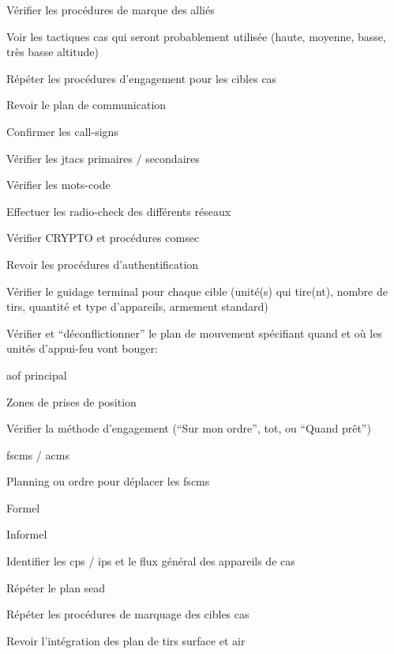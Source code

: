 \begin{e1}
\begin{e2}
\begin{e3}
			\item Vérifier les procédures de marque des alliés
			\item Voir les tactiques \gls{cas} qui seront probablement utilisée (haute, moyenne, basse, très basse altitude)
			\item Répéter les procédures d'engagement pour les cibles \gls{cas}
			\item Revoir le plan de communication
			\begin{e4}
				\item Confirmer les call-signs
				\item Vérifier les \glspl{jtac} primaires / secondaires
				\item Vérifier les mots-code
				\item Effectuer les radio-check des différents réseaux
				\item Vérifier CRYPTO et procédures \gls{comsec}
				\item Revoir les procédures d'authentification
			\end{e4}
			\item Vérifier le guidage terminal pour chaque cible (unité(s) qui tire(nt), nombre de tirs, quantité et type d'appareils, armement standard)
			\item Vérifier et ``déconflictionner'' le plan de mouvement spécifiant quand et où les unités d'appui-feu vont bouger:
			\begin{e4}
				\item \gls{aof} principal
				\item Zones de prises de position
			\end{e4}
			\item Vérifier la méthode d'engagement (``Sur mon ordre'', \gls{tot}, ou ``Quand prêt'')
			\item \glspl{fscm} / \glspl{acm}
			\begin{e4}
				\item Planning ou ordre pour déplacer les \glspl{fscm}
				\item Formel
				\item Informel
			\end{e4}
			\item Identifier les \glspl{cp} / \glspl{ip} et le flux général des appareils de \gls{cas}
			\item Répéter le plan \gls{sead}
			\item Répéter les procédures de marquage des cibles \gls{cas}
			\begin{e4}
				\item Revoir l'intégration des plan de tirs surface et air

\end{e4}
\end{e3}
\end{e2}
\end{e1}
